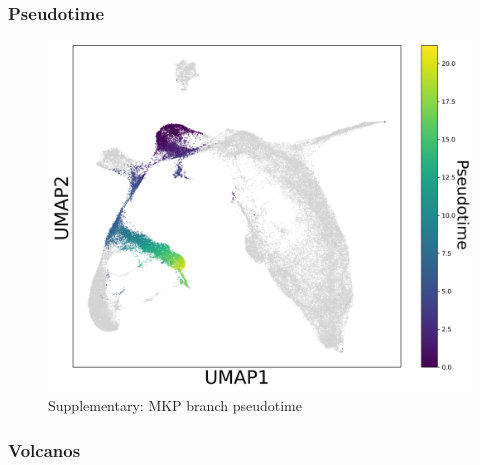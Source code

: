 \documentclass[a4paper]{article}
\begin{document}
\subsubsection{Pseudotime}
\begin{figure}[!htb]
  \centering
  \includegraphics[width=\textwidth]{../figures/hematopoiesis/MKP_40_110_single_branch_pseudotime.png}
  \caption{Supplementary: MKP branch pseudotime}
\end{figure}

\FloatBarrier
\subsubsection{Volcanos}
\end{document}
